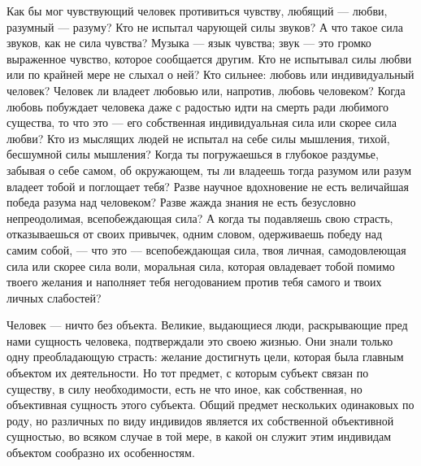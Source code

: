 \documentclass[12pt,oneside]{book}
\begin{document}
Как бы мог чувствующий человек противиться чувству, любящий --- любви, разумный --- разуму? Кто не испытал чарующей силы звуков? А что такое сила звуков, как не сила чувства? Музыка --- язык чувства; звук --- это громко выраженное чувство, которое сообщается другим. Кто не испытывал силы любви или по крайней мере не слыхал о ней? Кто сильнее: любовь или индивидуальный человек? Человек ли владеет любовью или, напротив, любовь человеком? Когда любовь побуждает человека даже с радостью идти на смерть ради любимого существа, то что это --- его собственная индивидуальная сила или скорее сила любви? Кто из мыслящих людей не испытал на себе силы мышления, тихой, бесшумной силы мышления? Когда ты погружаешься в глубокое раздумье, забывая о себе самом, об окружающем, ты ли владеешь тогда разумом или разум владеет тобой и поглощает тебя? Разве научное вдохновение не есть величайшая победа разума над человеком? Разве жажда знания не есть безусловно непреодолимая, всепобеждающая сила? А когда ты подавляешь свою страсть, отказываешься от своих привычек, одним словом, одерживаешь победу над самим собой, --- что это --– всепобеждающая сила, твоя личная, самодовлеющая сила или скорее сила воли, моральная сила, которая овладевает тобой помимо твоего желания и наполняет тебя негодованием против тебя самого и твоих личных слабостей?\ddag\let\svthefootnote\thefootnote
\let\thefootnote\relax{}\let\thefootnote\svthefootnote


Человек --- ничто без объекта. Великие, выдающиеся люди, раскрывающие пред нами сущность человека, подтверждали это своею жизнью. Они знали только одну преобладающую страсть: желание достигнуть цели, которая была главным объектом их деятельности. Но тот предмет, с которым субъект связан по существу, в силу необходимости, есть не что иное, как собственная, но объективная сущность этого субъекта. Общий предмет нескольких одинаковых по роду, но различных по виду индивидов является их собственной объективной сущностью, во всяком случае в той мере, в какой он служит этим индивидам объектом сообразно их особенностям.
\end{document}

